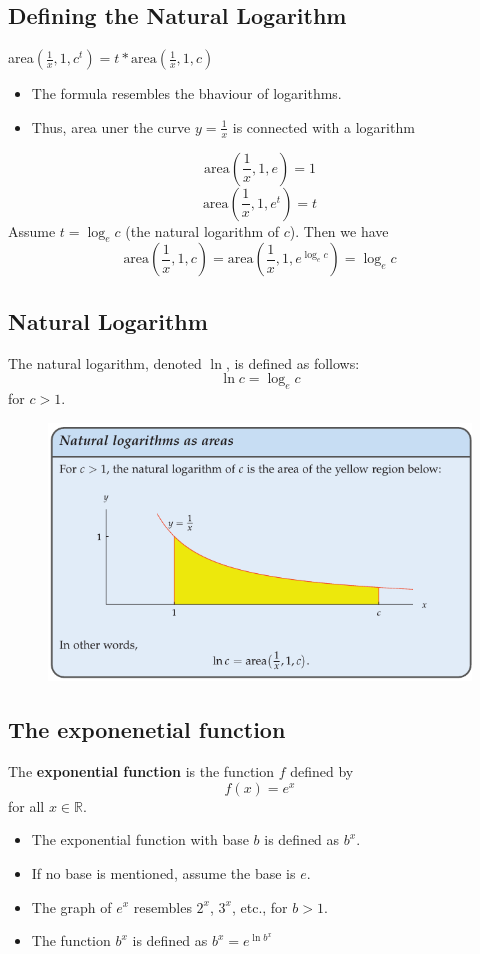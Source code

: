 \subsection{Defining the Natural Logarithm}
area\((\frac{1}{x},1,c^{t}) = t*\text{area}(\frac{1}{x},1,c) \)
\begin{itemize}
  \item The formula resembles the bhaviour of logarithms.
  \item Thus, area uner the curve \(y = \frac{1}{x}\) is connected with a logarithm
\end{itemize}
\[\text{area}(\frac{1}{x},1,e) = 1 \]
\[\text{area}(\frac{1}{x},1,e^{t}) = t \]
Assume \(t = \log_e c\) (the natural logarithm of \(c\)). Then we have
\[\text{area}(\frac{1}{x},1,c) = \text{area}(\frac{1}{x},1,e^{\log_e c}) = \log_e c\]

\subsection{Natural Logarithm}
The natural logarithm, denoted \(\ln\), is defined as follows:
\[ \ln c = \log_e c \]
for \(c > 1\).
\begin{figure}
  \centering
  \includegraphics[scale=0.35]{pics/e_5.png}
\end{figure}

\subsection{The exponenetial function}
The \textbf{exponential function} is the function \(f\) defined by
\[ f(x) = e^{x} \]
for all \(x \in \mathbb{R}\).
\begin{itemize}
    \item The exponential function with base \( b \) is defined as \( b^x \).
    \item If no base is mentioned, assume the base is \( e \).
    \item The graph of \( e^x \) resembles \( 2^x \), \( 3^x \), etc., for \( b > 1 \).
    \item The function \(b^{x}\) is defined as \( b^{x} = e^{\ln b^{x}} \)
\end{itemize}

